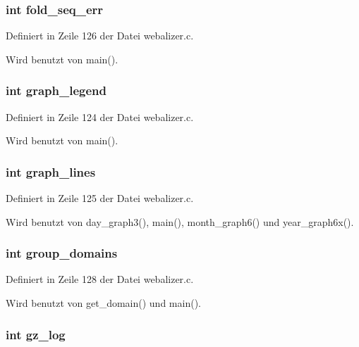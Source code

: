 \subsubsection{\setlength{\rightskip}{0pt plus 5cm}int {\bf fold\_\-seq\_\-err}}\label{webalizer_8h_23652bde57737d1f6f700f29c4762728}




Definiert in Zeile 126 der Datei webalizer.c.

Wird benutzt von main().
\subsubsection{\setlength{\rightskip}{0pt plus 5cm}int {\bf graph\_\-legend}}\label{webalizer_8h_8209c1ed16bfdf4913b7837d8d0b8520}




Definiert in Zeile 124 der Datei webalizer.c.

Wird benutzt von main().
\subsubsection{\setlength{\rightskip}{0pt plus 5cm}int {\bf graph\_\-lines}}\label{webalizer_8h_b0e6606dc823003635fbd6408bd03439}




Definiert in Zeile 125 der Datei webalizer.c.

Wird benutzt von day\_\-graph3(), main(), month\_\-graph6() und year\_\-graph6x().
\subsubsection{\setlength{\rightskip}{0pt plus 5cm}int {\bf group\_\-domains}}\label{webalizer_8h_3b91bd084088b32764aaa00f48083faf}




Definiert in Zeile 128 der Datei webalizer.c.

Wird benutzt von get\_\-domain() und main().
\subsubsection{\setlength{\rightskip}{0pt plus 5cm}int {\bf gz\_\-log}}\label{webalizer_8h_480128e1291f32b04678ddac9dc69457}




